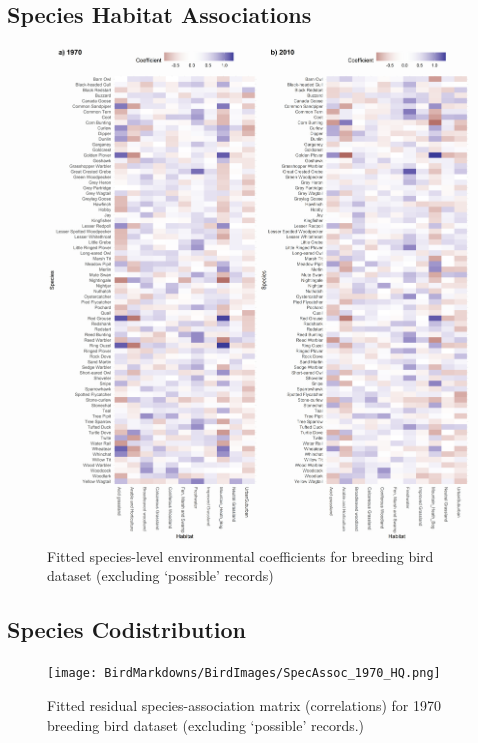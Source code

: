 \documentclass[
]{article}
\begin{document}
\hypertarget{species-habitat-associations}{%
\subsection{Species Habitat
Associations}\label{species-habitat-associations}}

\begin{figure}
\centering
\includegraphics[width=\textwidth,height=0.7\textheight]{BirdMarkdowns/BirdImages/BirdHabitatbothHQ.png}
\caption{Fitted species-level environmental coefficients for breeding
bird dataset (excluding `possible' records)}
\end{figure}

\hypertarget{species-codistribution}{%
\subsection{Species Codistribution}\label{species-codistribution}}

\begin{figure}
\centering
\texttt{[image: BirdMarkdowns/BirdImages/SpecAssoc\_1970\_HQ.png]}
\caption{Fitted residual species-association matrix (correlations) for
1970 breeding bird dataset (excluding `possible' records.)}
\end{figure}
\end{document}
